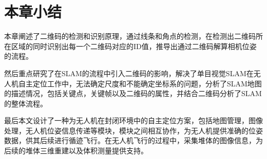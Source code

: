 \section{本章小结}
\label{sec:2.5}
本章阐述了二维码的检测和识别原理，通过线条和角点的检测，在检测出二维码所在区域的同时识别出每一个二维码对应的ID值，推导出通过二维码解算相机位姿的流程。

然后重点研究了在SLAM的流程中引入二维码的影响，解决了单目视觉SLAM在无人机自主定位工作中，无法确定尺度和不能确定坐标系的问题，分析了SLAM地图的描述情况，包括关键点，关键帧以及二维码的属性，并结合二维码分析了SLAM的整体流程。

最后本文设计了一种为无人机在封闭环境中的自主定位方案，包括地图管理，图像处理，无人机位姿信息传递等模块，模块之间相互协作，为无人机提供准确的位姿数据，供其后续进行循迹飞行。在无人机飞行的过程中，采集堆体的图像信息，为后续的堆体三维重建以及体积测量提供支持。
